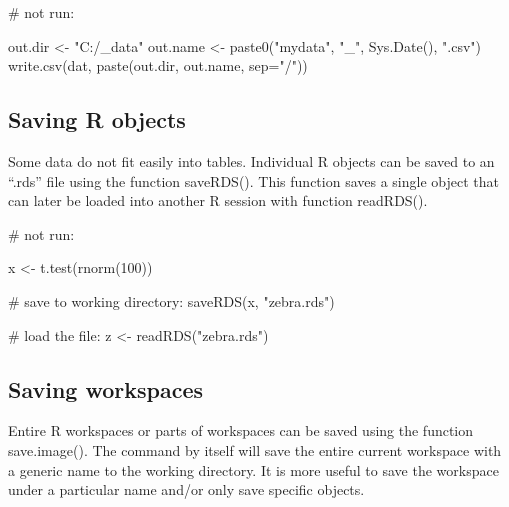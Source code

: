 \documentclass[
  13,
  letterpaper,
]{report}
\newenvironment{Shaded}{\begin{snugshade}}{\end{snugshade}}
\newcommand{\AttributeTok}[1]{\textcolor[rgb]{0.40,0.45,0.13}{#1}}
\newcommand{\CommentTok}[1]{\textcolor[rgb]{0.37,0.37,0.37}{#1}}
\newcommand{\DecValTok}[1]{\textcolor[rgb]{0.68,0.00,0.00}{#1}}
\newcommand{\FunctionTok}[1]{\textcolor[rgb]{0.28,0.35,0.67}{#1}}
\newcommand{\NormalTok}[1]{\textcolor[rgb]{0.00,0.23,0.31}{#1}}
\newcommand{\OtherTok}[1]{\textcolor[rgb]{0.00,0.23,0.31}{#1}}
\newcommand{\StringTok}[1]{\textcolor[rgb]{0.13,0.47,0.30}{#1}}
\begin{document}
\begin{Shaded}
\begin{Highlighting}[]
\CommentTok{\# not run:}

\NormalTok{out.dir }\OtherTok{\textless{}{-}} \StringTok{"C:/\_data"}
\NormalTok{out.name }\OtherTok{\textless{}{-}} \FunctionTok{paste0}\NormalTok{(}\StringTok{"mydata"}\NormalTok{, }\StringTok{"\_"}\NormalTok{, }\FunctionTok{Sys.Date}\NormalTok{(), }\StringTok{".csv"}\NormalTok{)}
\FunctionTok{write.csv}\NormalTok{(dat, }\FunctionTok{paste}\NormalTok{(out.dir, out.name, }\AttributeTok{sep=}\StringTok{"/"}\NormalTok{))}
\end{Highlighting}
\end{Shaded}

\subsection{Saving R objects}\label{sec-04-export-robj}

Some data do not fit easily into tables. Individual R objects can be
saved to an ``.rds'' file using the function saveRDS(). This function
saves a single object that can later be loaded into another R session
with function readRDS().

\begin{Shaded}
\begin{Highlighting}[]
\CommentTok{\# not run:}

\NormalTok{x }\OtherTok{\textless{}{-}} \FunctionTok{t.test}\NormalTok{(}\FunctionTok{rnorm}\NormalTok{(}\DecValTok{100}\NormalTok{))}

\CommentTok{\# save to working directory:}
\FunctionTok{saveRDS}\NormalTok{(x, }\StringTok{"zebra.rds"}\NormalTok{)}

\CommentTok{\# load the file:}
\NormalTok{z }\OtherTok{\textless{}{-}} \FunctionTok{readRDS}\NormalTok{(}\StringTok{"zebra.rds"}\NormalTok{)}
\end{Highlighting}
\end{Shaded}

\subsection{Saving workspaces}\label{sec-04-export-rdata}

Entire R workspaces or parts of workspaces can be saved using the
function save.image(). The command by itself will save the entire
current workspace with a generic name to the working directory. It is
more useful to save the workspace under a particular name and/or only
save specific objects.
\end{document}
